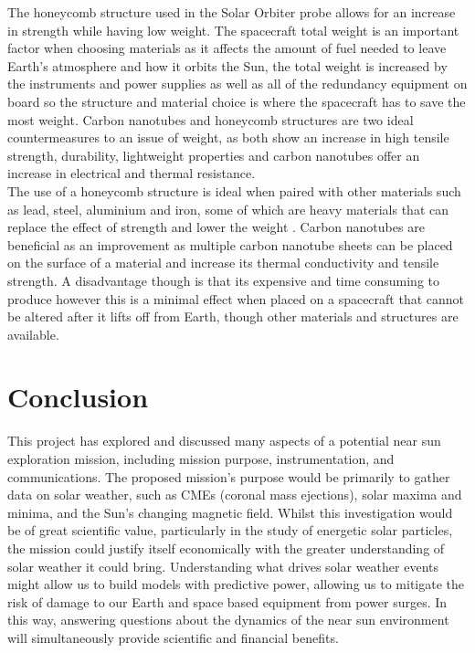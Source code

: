 \documentclass[12pt]{article}
\begin{document}
The honeycomb structure used in the Solar Orbiter probe allows for an increase in strength while having low weight. The spacecraft total weight is an important factor when choosing materials as it affects the amount of fuel needed to leave Earth's atmosphere and how it orbits the Sun, the total weight is increased by the instruments and power supplies as well as all of the redundancy equipment on board so the structure and material choice is where the spacecraft has to save the most weight. Carbon nanotubes and honeycomb structures are two ideal countermeasures to an issue of weight, as both show an increase in high tensile strength, durability, lightweight properties and carbon nanotubes offer an increase in electrical and thermal resistance. \\

The use of a honeycomb structure is ideal when paired with other materials such as lead, steel, aluminium and iron, some of which are heavy materials that can replace the effect of strength and lower the weight \cite{Honey1}. Carbon nanotubes are beneficial as an improvement as multiple carbon nanotube sheets can be placed on the surface of a material and increase its thermal conductivity and tensile strength. A disadvantage though is that its expensive and time consuming to produce however this is a minimal effect when placed on a spacecraft that cannot be altered after it lifts off from Earth, though other materials and structures are available. \\




\section{Conclusion} 

\label{Conclusion Section} 

This project has explored and discussed many aspects of a potential near sun exploration mission, including mission purpose, instrumentation, and communications. The proposed mission's purpose would be primarily to gather data on solar weather, such as CMEs (coronal mass ejections), solar maxima and minima, and the Sun's changing magnetic field. Whilst this investigation would be of great scientific value, particularly in the study of energetic solar particles, the mission could justify itself economically with the greater understanding of solar weather it could bring. Understanding what drives solar weather events might allow us to build models with predictive power, allowing us to mitigate the risk of damage to our Earth and space based equipment from power surges. In this way, answering questions about the dynamics of the near sun environment will simultaneously provide scientific and financial benefits. \\
\end{document}
